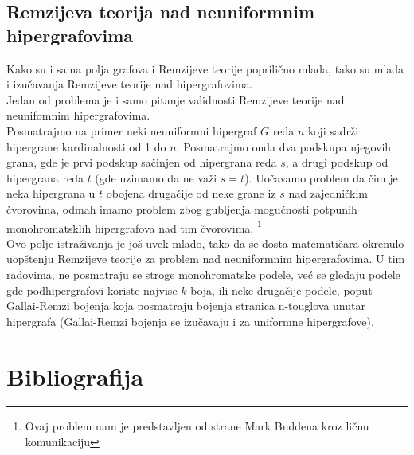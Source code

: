 \documentclass[a4paper]{article}
\begin{document}
	\subsection{Remzijeva teorija nad neuniformnim hipergrafovima}\label{neuniformni}
	
	Kako su i sama polja grafova i Remzijeve teorije poprilično mlada, tako su mlada i izučavanja Remzijeve teorije nad hipergrafovima. \\
	Jedan od problema je  i samo pitanje validnosti Remzijeve teorije nad neunifomnim hipergrafovima.\\
	Posmatrajmo na primer neki neuniformni hipergraf $G$ reda $n$ koji sadrži hipergrane kardinalnosti od 1 do $n$. Posmatrajmo onda dva podskupa njegovih grana, gde je prvi podskup sačinjen od  hipergrana reda $s$, a drugi podskup od hipergrana reda $t$ (gde uzimamo da ne važi $s=t$). Uočavamo problem da čim je neka hipergrana u $t$ obojena drugačije od neke grane iz $s$ nad zajedničkim čvorovima, odmah imamo problem zbog gubljenja mogućnosti potpunih monohromatsklih hipergrafova nad tim čvorovima.  \footnote{Ovaj problem nam je predstavljen od strane Mark Buddena kroz ličnu komunikaciju} %
	\\Ovo polje istraživanja je još uvek mlado, tako da se dosta matematičara okrenulo uopštenju Remzijeve teorije za problem nad neuniformnim hipergrafovima. U tim radovima, ne posmatraju se stroge monohromatske podele, već se gledaju podele gde podhipergrafovi koriste najvise $k$ boja, ili neke drugačije podele, poput Gallai-Remzi bojenja koja posmatraju bojenja stranica n-touglova unutar hipergrafa (Gallai-Remzi bojenja se izučavaju i za uniformne hipergrafove).
	\pagebreak
	\section{Bibliografija}	
	\printbibliography
\end{document}
